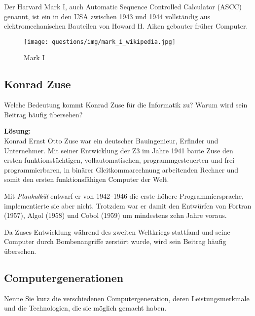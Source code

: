 \documentclass[11pt,a4paper,DIV=12]{scrartcl}
\newcommand{\loesung}{\textbf{Lösung:}\\}
\begin{document}
Der Harvard Mark I, auch Automatic Sequence Controlled Calculator (ASCC) genannt, ist ein in den USA zwischen 1943 und 1944 vollständig aus elektromechanischen Bauteilen von Howard H. Aiken gebauter früher Computer.

\begin{figure}[ht!]
  \centering
  \texttt{[image: questions/img/mark\_i\_wikipedia.jpg]}
  \caption{Mark I}
\end{figure}

\subsection{Konrad Zuse}
Welche Bedeutung kommt Konrad Zuse für die Informatik zu? Warum wird sein Beitrag häufig übersehen?

\loesung
Konrad Ernst Otto Zuse war ein deutscher Bauingenieur, Erfinder und Unternehmer. Mit seiner Entwicklung der Z3 im Jahre 1941 baute Zuse den ersten funktionstüchtigen, vollautomatischen, programmgesteuerten und frei programmierbaren, in binärer Gleitkommarechnung arbeitenden Rechner und somit den ersten funktionsfähigen Computer der Welt.

Mit \emph{Plankalkül} entwarf er von 1942--1946 die erste höhere Programmiersprache, implementierte sie aber nicht. Trotzdem war er damit den Entwürfen von Fortran (1957), Algol (1958) und Cobol (1959) um mindestens zehn Jahre voraus.

Da Zuses Entwicklung während des zweiten Weltkriegs stattfand und seine Computer durch Bombenangriffe zerstört wurde, wird sein Beitrag häufig übersehen.

\subsection{Computergenerationen}
Nenne Sie kurz die verschiedenen Computergeneration, deren Leistungsmerkmale und die Technologien, die sie möglich gemacht haben.
\end{document}
